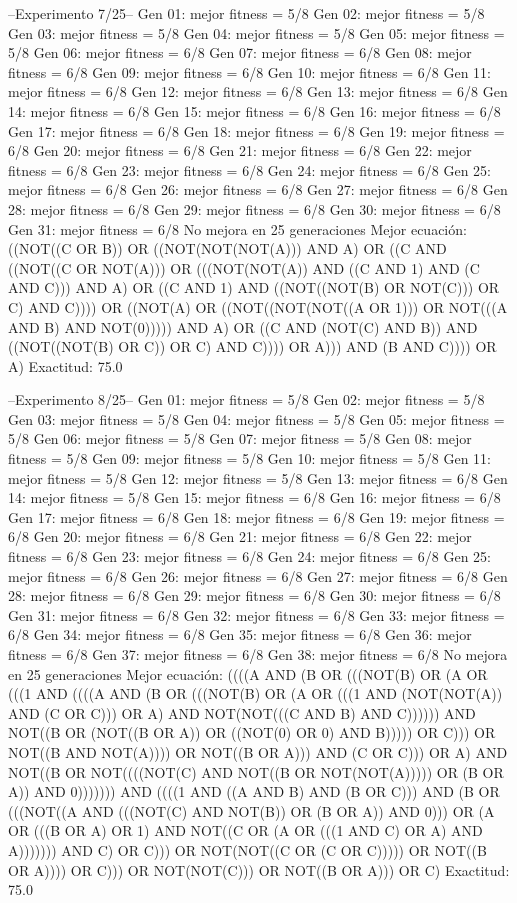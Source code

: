 --Experimento 
 7/25--
Gen 01: mejor fitness = 5/8
Gen 02: mejor fitness = 5/8
Gen 03: mejor fitness = 5/8
Gen 04: mejor fitness = 5/8
Gen 05: mejor fitness = 5/8
Gen 06: mejor fitness = 6/8
Gen 07: mejor fitness = 6/8
Gen 08: mejor fitness = 6/8
Gen 09: mejor fitness = 6/8
Gen 10: mejor fitness = 6/8
Gen 11: mejor fitness = 6/8
Gen 12: mejor fitness = 6/8
Gen 13: mejor fitness = 6/8
Gen 14: mejor fitness = 6/8
Gen 15: mejor fitness = 6/8
Gen 16: mejor fitness = 6/8
Gen 17: mejor fitness = 6/8
Gen 18: mejor fitness = 6/8
Gen 19: mejor fitness = 6/8
Gen 20: mejor fitness = 6/8
Gen 21: mejor fitness = 6/8
Gen 22: mejor fitness = 6/8
Gen 23: mejor fitness = 6/8
Gen 24: mejor fitness = 6/8
Gen 25: mejor fitness = 6/8
Gen 26: mejor fitness = 6/8
Gen 27: mejor fitness = 6/8
Gen 28: mejor fitness = 6/8
Gen 29: mejor fitness = 6/8
Gen 30: mejor fitness = 6/8
Gen 31: mejor fitness = 6/8
No mejora en 25 generaciones
Mejor ecuación: ((NOT((C OR B)) OR ((NOT(NOT(NOT(A))) AND A) OR ((C AND ((NOT((C OR NOT(A))) OR (((NOT(NOT(A)) AND ((C AND 1) AND (C AND C))) AND A) OR ((C AND 1) AND ((NOT((NOT(B) OR NOT(C))) OR C) AND C)))) OR ((NOT(A) OR ((NOT((NOT(NOT((A OR 1))) OR NOT(((A AND B) AND NOT(0))))) AND A) OR ((C AND (NOT(C) AND B)) AND ((NOT((NOT(B) OR C)) OR C) AND C)))) OR A))) AND (B AND C)))) OR A)
 Exactitud: 75.0%

--Experimento 
 8/25--
Gen 01: mejor fitness = 5/8
Gen 02: mejor fitness = 5/8
Gen 03: mejor fitness = 5/8
Gen 04: mejor fitness = 5/8
Gen 05: mejor fitness = 5/8
Gen 06: mejor fitness = 5/8
Gen 07: mejor fitness = 5/8
Gen 08: mejor fitness = 5/8
Gen 09: mejor fitness = 5/8
Gen 10: mejor fitness = 5/8
Gen 11: mejor fitness = 5/8
Gen 12: mejor fitness = 5/8
Gen 13: mejor fitness = 6/8
Gen 14: mejor fitness = 5/8
Gen 15: mejor fitness = 6/8
Gen 16: mejor fitness = 6/8
Gen 17: mejor fitness = 6/8
Gen 18: mejor fitness = 6/8
Gen 19: mejor fitness = 6/8
Gen 20: mejor fitness = 6/8
Gen 21: mejor fitness = 6/8
Gen 22: mejor fitness = 6/8
Gen 23: mejor fitness = 6/8
Gen 24: mejor fitness = 6/8
Gen 25: mejor fitness = 6/8
Gen 26: mejor fitness = 6/8
Gen 27: mejor fitness = 6/8
Gen 28: mejor fitness = 6/8
Gen 29: mejor fitness = 6/8
Gen 30: mejor fitness = 6/8
Gen 31: mejor fitness = 6/8
Gen 32: mejor fitness = 6/8
Gen 33: mejor fitness = 6/8
Gen 34: mejor fitness = 6/8
Gen 35: mejor fitness = 6/8
Gen 36: mejor fitness = 6/8
Gen 37: mejor fitness = 6/8
Gen 38: mejor fitness = 6/8
No mejora en 25 generaciones
Mejor ecuación: ((((A AND (B OR (((NOT(B) OR (A OR (((1 AND ((((A AND (B OR (((NOT(B) OR (A OR (((1 AND (NOT(NOT(A)) AND (C OR C))) OR A) AND NOT(NOT(((C AND B) AND C)))))) AND NOT((B OR (NOT((B OR A)) OR ((NOT(0) OR 0) AND B))))) OR C))) OR NOT((B AND NOT(A)))) OR NOT((B OR A))) AND (C OR C))) OR A) AND NOT((B OR NOT((((NOT(C) AND NOT((B OR NOT(NOT(A))))) OR (B OR A)) AND 0))))))) AND ((((1 AND ((A AND B) AND (B OR C))) AND (B OR (((NOT((A AND (((NOT(C) AND NOT(B)) OR (B OR A)) AND 0))) OR (A OR (((B OR A) OR 1) AND NOT((C OR (A OR (((1 AND C) OR A) AND A))))))) AND C) OR C))) OR NOT(NOT((C OR (C OR C))))) OR NOT((B OR A)))) OR C))) OR NOT(NOT(C))) OR NOT((B OR A))) OR C)
 Exactitud: 75.0%

